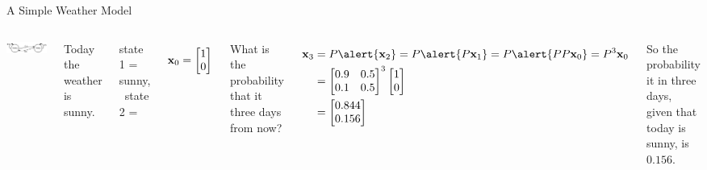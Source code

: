 \documentclass[xcolor=dvipsnames,aspectratio=169,t]{beamer}
\begin{document}
\begin{frame}{A Simple Weather Model}
  \bigskip

  \begin{columns}[T]
  \column{0.5\tw}

  \begin{center}
  \includegraphics[width=0.9\tw]{images/fig-weather.png}
  \end{center}

  Today the weather is \alert{sunny}.
  \medskip
  
  state 1 = \alert{sunny}, \ state 2 = 

  \[ \mathbf{x}_0 = \begin{bmatrix} 1 \\ 0 \end{bmatrix} \]
  \vspace*{-.5em}

  What is the probability that it  three days from now?

  \column{0.5\tw}

  \pause
  \begin{align*}
  \x_3 &= P \alert{\x_2} = P \alert{P \x_1} = P \alert{P P \x_0} = P^3 \x_0 \\
  &= \begin{bmatrix} 0.9 & 0.5 \\ 0.1 & 0.5 \end{bmatrix}^3 \begin{bmatrix} 1 \\ 0 \end{bmatrix} \\
  &= \begin{bmatrix} 0.844 \\ 0.156 \end{bmatrix}
  \end{align*}
  
  So the probability it  in three days, given that today is \alert{sunny}, is $0.156$.
  
  \end{columns}
\end{frame}
\end{document}
